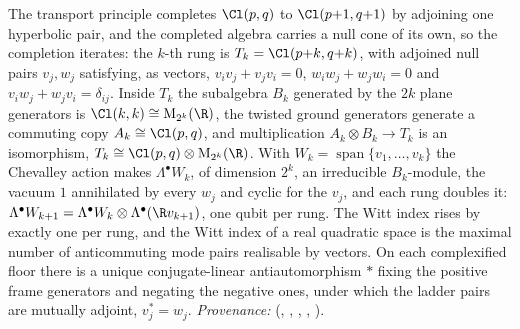 The transport principle completes $\Cl(p,q)$ to $\Cl(p{+}1,q{+}1)$ by adjoining one hyperbolic pair, and the completed algebra carries a null cone of its own, so the completion iterates: the $k$-th rung is $T_{k} = \Cl(p{+}k, q{+}k)$, with adjoined null pairs $v_{j}, w_{j}$ satisfying, as vectors, $v_{i}v_{j} + v_{j}v_{i} = 0$, $w_{i}w_{j} + w_{j}w_{i} = 0$ and $v_{i}w_{j} + w_{j}v_{i} = \delta_{ij}$. Inside $T_{k}$ the subalgebra $B_{k}$ generated by the $2k$ plane generators is $\Cl(k,k) \cong \mathrm{M}_{2^{k}}(\R)$, the twisted ground generators generate a commuting copy $A_{k} \cong \Cl(p,q)$, and multiplication $A_{k} \otimes B_{k} \to T_{k}$ is an isomorphism, $T_{k} \cong \Cl(p,q) \otimes \mathrm{M}_{2^{k}}(\R)$. With $W_{k} = \operatorname{span}\{v_{1}, \ldots, v_{k}\}$ the Chevalley action makes $\Lambda^{\bullet}W_{k}$, of dimension $2^{k}$, an irreducible $B_{k}$-module, the vacuum $1$ annihilated by every $w_{j}$ and cyclic for the $v_{j}$, and each rung doubles it: $\Lambda^{\bullet}W_{k+1} = \Lambda^{\bullet}W_{k} \otimes \Lambda^{\bullet}(\R v_{k+1})$, one qubit per rung. The Witt index rises by exactly one per rung, and the Witt index of a real quadratic space is the maximal number of anticommuting mode pairs realisable by vectors. On each complexified floor there is a unique conjugate-linear antiautomorphism $*$ fixing the positive frame generators and negating the negative ones, under which the ladder pairs are mutually adjoint, $v_{j}^{*} = w_{j}$. \emph{Provenance:} \cite[Def.~2.2, Thm.~3.2, Prop.~4.1, Thms.~4.2, 4.3, Lem.~5.4]{ButlerT3} (, , , , ).
